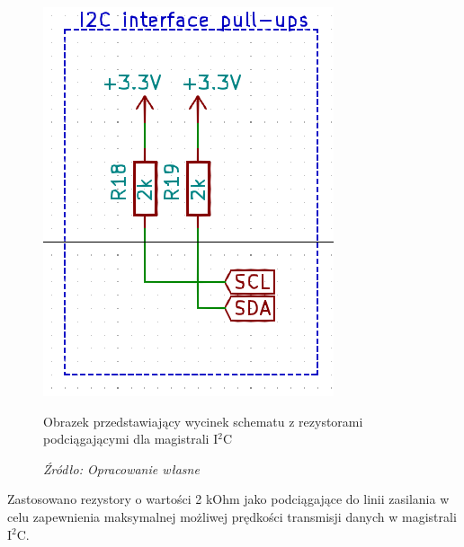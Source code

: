 \documentclass[12pt,a4paper,oneside]{memoir}
\begin{document}
\begin{figure}[!h]
	\centering
	\includegraphics[scale=0.5]{images/sch/sch-10.png}
	{\tytulyrozdzialow \footnotesize \caption[Schemat - rezystory interfejsu I$^2$C] {Obrazek przedstawiający wycinek schematu z rezystorami podciągającymi dla magistrali I$^2$C}}
	\caption*{\textit{Źródło: Opracowanie własne}}
\end{figure}
\par Zastosowano rezystory o wartości 2 kOhm jako podciągające do linii zasilania w celu zapewnienia maksymalnej możliwej prędkości transmisji danych w magistrali I$^2$C.
\end{document}
